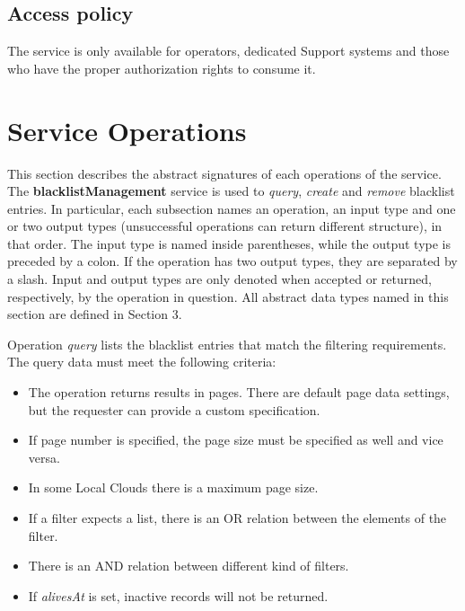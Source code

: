 \documentclass[a4paper]{arrowhead}
\begin{document}
\subsection{Access policy}
\label{sec:accesspolicy}

The service is only available for operators, dedicated Support systems and those who have the proper authorization rights to consume it.

\newpage

\section{Service Operations}
\label{sec:functions}

This section describes the abstract signatures of each operations of the service. The \textbf{blacklistManagement} service is used to \textit{query}, \textit{create} and \textit{remove} blacklist entries.
In particular, each subsection names an operation, an input type and one or two output types (unsuccessful operations can return different structure), in that order.
The input type is named inside parentheses, while the output type is preceded by a colon. If the operation has two output types, they are separated by a slash.
Input and output types are only denoted when accepted or returned, respectively, by the operation in question. All abstract data types named in this section are defined in Section 3.

{}

Operation \textit{query} lists the blacklist entries that match the filtering requirements. The query data must meet the following criteria:

\begin{itemize}
    \item The operation returns results in pages. There are default page data settings, but the requester can provide a custom specification.
    \item If page number is specified, the page size must be specified as well and vice versa.
    \item In some Local Clouds there is a maximum page size.
    \item If a filter expects a list, there is an OR relation between the elements of the filter.
    \item There is an AND relation between different kind of filters.
    \item If \textit{alivesAt} is set, inactive records will not be returned.
\end{itemize}
\end{document}
